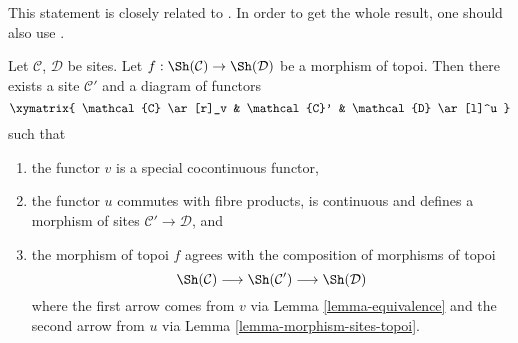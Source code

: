 \begin{lemma}
\label{lemma-morphism-topoi-comes-from-morphism-sites}
\begin{reference}
This statement is closely related to
\cite[Proposition 4.9.4. Expos\'e IV]{SGA4}.
In order to get the whole result, one should also use
\cite[Remarque 4.7.4, Expos\'e IV]{SGA4}.
\end{reference}
Let $\mathcal{C}$, $\mathcal{D}$ be sites.
Let $f : \Sh(\mathcal{C}) \to \Sh(\mathcal{D})$ be a
morphism of topoi.
Then there exists a site $\mathcal{C}'$ and a diagram of functors
$$
\xymatrix{
\mathcal{C} \ar[r]_v & \mathcal{C}' & \mathcal{D} \ar[l]^u
}
$$
such that
\begin{enumerate}
\item the functor $v$ is a special cocontinuous functor,
\item the functor $u$ commutes with fibre products, is
continuous and defines a morphism of sites
$\mathcal{C}' \to \mathcal{D}$, and
\item the morphism of topoi $f$ agrees with the composition
of morphisms of topoi
$$
\Sh(\mathcal{C}) \longrightarrow
\Sh(\mathcal{C}') \longrightarrow
\Sh(\mathcal{D})
$$
where the first arrow comes from $v$ via Lemma \ref{lemma-equivalence}
and the second arrow from $u$ via Lemma \ref{lemma-morphism-sites-topoi}.
\end{enumerate}
\end{lemma}

